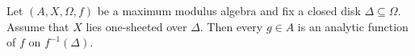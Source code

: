 
Let $(A, X, \Omega, f)$ be a maximum modulus algebra and fix a closed disk $\Delta \subseteq \Omega$. Assume that $X$ lies one-sheeted over $\Delta$. Then every $g \in A$ is an analytic function of $f$ on $f^{-1}(\Delta)$.
